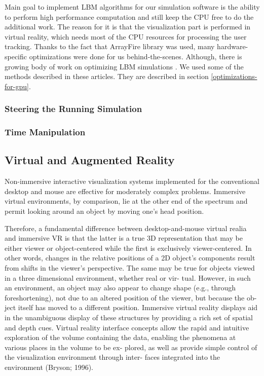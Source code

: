 Main goal to implement LBM algorithms for our simulation software is the ability to perform high performance computation and still keep the CPU free to do the additional work. The reason for it is that the visualization part is performed in virtual reality, which needs most of the CPU resources for processing the user tracking. Thanks to the fact that ArrayFire library was used, many hardware-specific optimizations were done for us behind-the-scenes. Although, there is growing body of work on optimizing LBM simulations \citep{wangInteractive3DFluid2019, wittmannLatticeBoltzmannBenchmark2018, tranPerformanceOptimization3D2017, kornerParallelLatticeBoltzmann2006, harwoodParallelisationInteractiveLatticeBoltzmann2017, harwoodREALTIMEMODELLINGSIMULATION}. We used some of the methods described in these articles. They are described in section \ref{optimizations-for-gpu}.

\subsubsection{Steering the Running Simulation}

\subsubsection{Time Manipulation}

\subsection{Virtual and Augmented Reality}

Non-immersive interactive visualization systems implemented for the conventional desktop and mouse are effective for moderately complex problems. Immersive virtual environments, by comparison, lie at the other end of the spectrum and permit looking around an object by moving one's head position.

Therefore, a fundamental difference between desktop-and-mouse virtual realia and immersive VR is that the latter is a true 3D representation that may be either viewer or object-centered while the first is exclusively viewer-centered. In other words, changes in the relative positions of a 2D object’s components result from shifts in the viewer’s perspective. The same may be true for objects viewed in a three dimensional environment, whether real or vir- tual. However, in such an environment, an object may also appear to change shape (e.g., through foreshortening), not due to an altered position of the viewer, but because the ob- ject itself has moved to a different position. Immersive virtual reality displays aid in the unambiguous display of these structures by providing a rich set of spatial and depth cues. Virtual reality interface concepts allow the rapid and intuitive exploration of the volume containing the data, enabling the phenomena at various places in the volume to be ex- plored, as well as provide simple control of the visualization environment through inter- faces integrated into the environment (Bryson; 1996).

